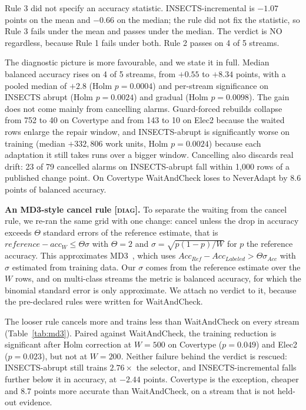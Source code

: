 \documentclass[conference]{IEEEtran}
\begin{document}
Rule 3 did not specify an accuracy statistic. INSECTS-incremental is $-1.07$
points on the mean and $-0.66$ on the median; the rule did not fix the statistic,
so Rule 3 fails under the mean and passes under the median. The verdict is NO
regardless, because Rule 1 fails under both. Rule 2 passes on 4 of 5 streams.

The diagnostic picture is more favourable, and we state it in full. Median
balanced accuracy rises on 4 of 5 streams, from $+0.55$ to $+8.34$ points, with a
pooled median of $+2.8$ (Holm $p=0.0004$) and per-stream significance on INSECTS
abrupt (Holm $p=0.0024$) and gradual (Holm $p=0.0098$). The gain does not come
mainly from cancelling alarms. Guard-forced rebuilds collapse from 752 to 40 on
Covertype and from 143 to 10 on Elec2 because the waited rows enlarge the repair
window, and INSECTS-abrupt is significantly worse on training (median
$+332{,}806$ work units, Holm $p=0.0024$) because each adaptation it still takes
runs over a bigger window. Cancelling also discards real drift: 23 of 79
cancelled alarms on INSECTS-abrupt fall within 1{,}000 rows of a published change
point. On Covertype WaitAndCheck loses to NeverAdapt by 8.6 points of balanced
accuracy.

\textbf{An MD3-style cancel rule \textsc{[diag]}.} To separate the waiting from
the cancel rule, we re-ran the same grid with one change: cancel unless the drop
in accuracy exceeds $\Theta$ standard errors of the reference estimate, that is
$\textit{reference}-\textit{acc}_W \leq \Theta\sigma$ with $\Theta=2$ and
$\sigma=\sqrt{p(1-p)/W}$ for $p$ the reference accuracy. This approximates
MD3~\cite{sethi2017}, which uses $Acc_{Ref}-Acc_{Labeled} > \Theta\sigma_{Acc}$
with $\sigma$ estimated from training data. Our $\sigma$ comes from the reference
estimate over the $W$ rows, and on multi-class streams the metric is balanced
accuracy, for which the binomial standard error is only approximate. We attach no
verdict to it, because the pre-declared rules were written for WaitAndCheck.

The looser rule cancels more and trains less than WaitAndCheck on every stream
(Table~\ref{tab:md3}). Paired against WaitAndCheck, the training reduction is
significant after Holm correction at $W=500$ on Covertype ($p=0.049$) and Elec2
($p=0.023$), but not at $W=200$. Neither failure behind the verdict is rescued:
INSECTS-abrupt still trains $2.76\times$ the selector, and INSECTS-incremental
falls further below it in accuracy, at $-2.44$ points. Covertype is the
exception, cheaper and 8.7 points more accurate than WaitAndCheck, on a stream
that is not held-out evidence.
\end{document}
